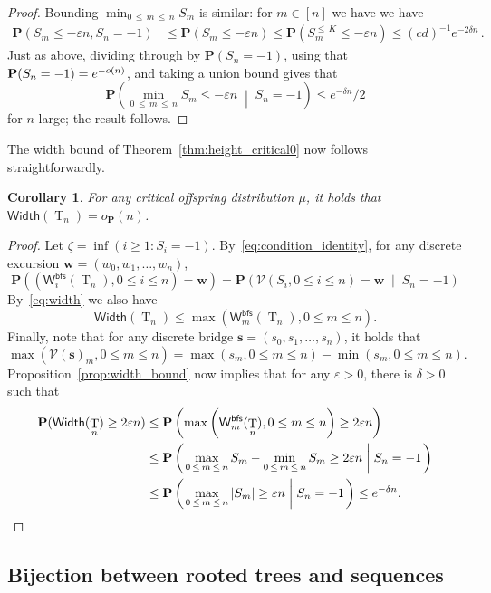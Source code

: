 \documentclass[10pt]{amsart}
\newtheorem{coro}[theo]{Corollary}
\theoremstyle{definition}
\numberwithin{figure}{section}
\newcommand*\W{\mathsf{W}}
\newcommand{\bfs}{\mathsf{bfs}}
\newcommand{\p}{\mathbf{P}}
\newcommand{\bfw}{\mathbf{w}}
\newcommand{\bffs}{\mathbf{s}}
\newcommand{\Width}{\mathsf{Width}}
\DeclareMathOperator{\rtree}{T}
\newcommand{\cV}{\mathcal{V}}
\newcommand{\set}[1]{\left(#1 \right)}
\newcommand{\Cprob}[2]{\mathbf{P}\set{\left. #1 \; \middle| \; #2\right.}}
\newcommand{\probC}[2]{\mathbf{P}\set{\left. #1 \; \middle| \; #2 \right. }}
\providecommand{\eps}{}
\renewcommand{\eps}{\varepsilon}
\begin{document}
\begin{proof}
Bounding $\min_{0\, \le\,m\,\le\,n} S_m$ is similar: for $m \in [n]$ we have we have
\begin{align*}
\p(S_m \le -\eps n,S_n=-1) & \le \p(S_m \le -\eps n) \le
\p\left(S_m^{\le\,K} \le -\eps n\right)
\le (cd)^{-1} e^{-2\delta n}\,.
\end{align*}
Just as above, dividing through by $\p(S_n=-1)$, using that $\p(S_n = -1)\linebreak = e^{-o(n)}$, and taking a union bound gives that
\[
\probC{\min_{0\,\le\,m\,\le\,n} S_m \le -\eps n}{S_n=-1}
\le e^{-\delta n}/2
\]
for $n$ large; the result follows.
\end{proof}

The width bound of Theorem~\ref{thm:height_critical0} now follows straightforwardly.
\begin{coro}\label{cor:width_bound}
For any critical offspring distribution $\mu$, it holds that\linebreak $\Width(\rtree_n)=o_{\p}(n)$.
\end{coro}
\begin{proof}
Let $\zeta=\inf(i \ge 1: S_i=-1)$. By~\eqref{eq:condition_identity}, for any discrete excursion $\bfw=(w_0,w_1,\ldots,w_n)$,
\[
\p\left(\left(\W^{\bfs}_{i}(\rtree_n),0 \le i \le n\right)=\bfw\right) =
\Cprob{\cV(S_i,0 \le i \le n)=\bfw}{S_n=-1}
\]
By~\eqref{eq:width} we also have
\[
\Width(\rtree_n) \leq \max \left(\W^{\bfs}_m(\rtree_n),0 \le m \le n\right).
\]
Finally, note that for any discrete bridge $\bffs=(s_0,s_1,\ldots,s_n)$, it holds that
\[
\max(\cV(\bffs)_m,0 \le m \le n) = \max(s_m,0 \le m \le n)-\min(s_m,0 \le m \le n).
\]
Proposition~\ref{prop:width_bound} now implies that for any $\eps > 0$, there is $\delta > 0$ such that
\begin{align*}
\p(\Width(\rtree_n) \ge 2\eps n) & \le \p\left(\max \left(\W^{\bfs}_m(\rtree_n),0 \le m \le n\right) \ge 2\eps n\right) \\
& \le \Cprob{\max_{0\, \le\,m \,\le\,n} S_m-\min_{0\,\le\,m\,\le\,n} S_m\ge 2\eps n}{S_n=-1} \\
& \le \Cprob{\max_{0\,\le\,m\,\le\,n} |S_m| \ge\eps n}{S_n=-1} \le e^{-\delta n}. \qedhere
\end{align*}
\end{proof}


\subsection{Bijection between rooted trees and sequences}
\end{document}

